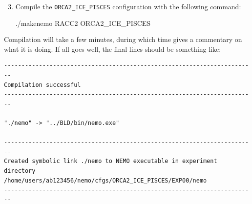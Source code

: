 \begin{enumerate}\setcounter{enumi}{2}
    \item Compile the \texttt{ORCA2_ICE_PISCES} configuration with the following command:
\begin{VerbatimCMD}
./makenemo  RACC2  ORCA2_ICE_PISCES
\end{VerbatimCMD}
\end{enumerate}

Compilation will take a few minutes, during which time  gives a commentary on what it is doing.
If all goes well, the final lines should be something like:

\begingroup\small
\begin{Verbatim}[samepage=true]
------------------------------------------------------------------------
Compilation successful
------------------------------------------------------------------------

"./nemo" -> "../BLD/bin/nemo.exe"

------------------------------------------------------------------------
Created symbolic link ./nemo to NEMO executable in experiment directory
/home/users/ab123456/nemo/cfgs/ORCA2_ICE_PISCES/EXP00/nemo
------------------------------------------------------------------------
\end{Verbatim}
\endgroup